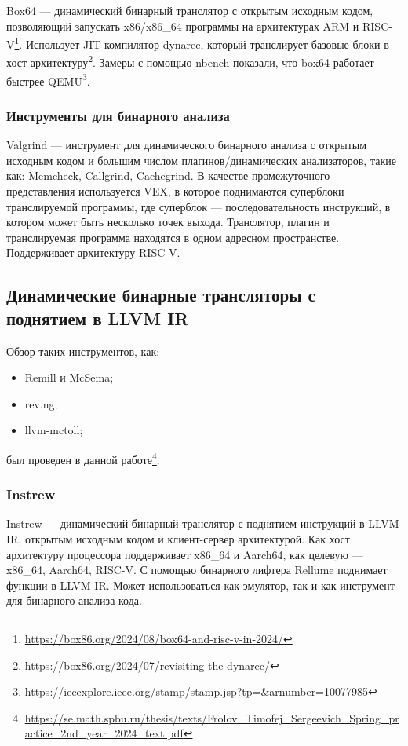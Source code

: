 Box64 --- динамический бинарный транслятор с открытым исходным кодом, позволяющий запускать x86/x86\_64 программы на архитектурах ARM и RISC-V\footnote{\href{https://box86.org/2024/08/box64-and-risc-v-in-2024/}{https://box86.org/2024/08/box64-and-risc-v-in-2024/}}. Использует JIT-компилятор dynarec, который транслирует базовые блоки в хост архитектуру\footnote{\href{https://box86.org/2024/07/revisiting-the-dynarec/}{https://box86.org/2024/07/revisiting-the-dynarec/}}. Замеры с помощью nbench показали, что box64 работает быстрее QEMU\footnote{\href{https://ieeexplore.ieee.org/stamp/stamp.jsp?tp=\&arnumber=10077985}{https://ieeexplore.ieee.org/stamp/stamp.jsp?tp=\&arnumber=10077985}}.
\subsubsection{Инструменты для бинарного анализа}
Valgrind --- инструмент для динамического бинарного анализа с открытым исходным кодом и большим числом плагинов/динамических анализаторов, такие как: Memcheck, Callgrind, Cachegrind. В качестве промежуточного представления используется VEX, в которое поднимаются суперблоки транслируемой программы, где суперблок --- последовательность инструкций, в котором может быть несколько точек выхода\cite{10.1145/1250734.1250746}. Транслятор, плагин и транслируемая программа находятся в одном адресном пространстве. Поддерживает архитектуру RISC-V.

\subsection{Динамические бинарные трансляторы с поднятием в LLVM IR}
Обзор таких инструментов, как:
\begin{itemize}
    \item Remill и McSema;
    \item rev.ng;
    \item llvm-mctoll;
\end{itemize}
был проведен в данной работе\footnote{\href{https://se.math.spbu.ru/thesis/texts/Frolov\_Timofej\_Sergeevich\_Spring\_practice\_2nd\_year\_2024\_text.pdf}{https://se.math.spbu.ru/thesis/texts/Frolov\_Timofej\_Sergeevich\_Spring\_practice\_2nd\_year\_2024\_text.pdf}}.
\subsubsection{Instrew}
Instrew --- динамический бинарный транслятор с поднятием инструкций в LLVM IR, открытым исходным кодом и клиент-сервер архитектурой. Как хост архитектуру процессора поддерживает x86\_64 и Aarch64, как целевую --- x86\_64, Aarch64, RISC-V. С помощью бинарного лифтера Rellume поднимает функции в LLVM IR. Может использоваться как эмулятор, так и как инструмент для бинарного анализа кода\cite{10.1145/3381052.3381319}.
